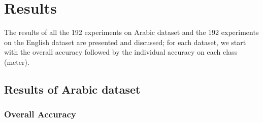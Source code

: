\documentclass[journal,10pt,twocolumns,letter]{IEEEtran}
\begin{document}
\section{Results}\label{sec:results}
The results of all the 192 experiments on Arabic dataset and the 192 experiments on the English
dataset are presented and discussed; for each dataset, we start with the overall accuracy
followed by the individual accuracy on each class (meter).

\subsection{Results of Arabic dataset}\label{sec:arabic-results}
\subsubsection{Overall Accuracy}\label{sec:encoding-effect}
\end{document}
